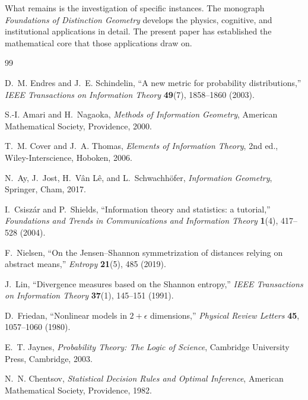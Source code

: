 \documentclass[12pt,a4paper]{article}
\theoremstyle{remark}
\theoremstyle{definition}
\begin{document}
What remains is the investigation of specific instances. The monograph
\emph{Foundations of Distinction Geometry} develops the physics,
cognitive, and institutional applications in detail. The present paper
has established the mathematical core that those applications draw on.


\begin{thebibliography}{99}

D.~M. Endres and J.~E. Schindelin,
``A new metric for probability distributions,''
\textit{IEEE Transactions on Information Theory} \textbf{49}(7),
1858--1860 (2003).

S.-I. Amari and H.~Nagaoka,
\textit{Methods of Information Geometry},
American Mathematical Society, Providence, 2000.

T.~M. Cover and J.~A. Thomas,
\textit{Elements of Information Theory}, 2nd ed.,
Wiley-Interscience, Hoboken, 2006.

N.~Ay, J.~Jost, H.~V\^an L\^e, and L.~Schwachh\"{o}fer,
\textit{Information Geometry},
Springer, Cham, 2017.

I.~Csisz\'{a}r and P.~Shields,
``Information theory and statistics: a tutorial,''
\textit{Foundations and Trends in Communications and Information Theory}
\textbf{1}(4), 417--528 (2004).

F.~Nielsen,
``On the Jensen--Shannon symmetrization of distances relying on abstract
means,''
\textit{Entropy} \textbf{21}(5), 485 (2019).

J.~Lin,
``Divergence measures based on the Shannon entropy,''
\textit{IEEE Transactions on Information Theory} \textbf{37}(1),
145--151 (1991).

D.~Friedan,
``Nonlinear models in $2+\epsilon$ dimensions,''
\textit{Physical Review Letters} \textbf{45}, 1057--1060 (1980).

E.~T. Jaynes,
\textit{Probability Theory: The Logic of Science},
Cambridge University Press, Cambridge, 2003.

N.~N. Chentsov,
\textit{Statistical Decision Rules and Optimal Inference},
American Mathematical Society, Providence, 1982.

\end{thebibliography}
\end{document}
